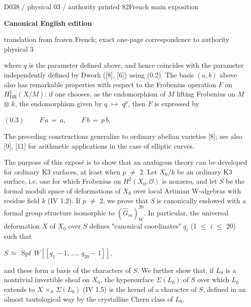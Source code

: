 \documentclass[9pt]{article}
\newcommand{\CanonText}[1]{\par{\fontsize{8.0}{9.35}\selectfont\RaggedRight #1\par}\vspace{2.2pt}}
\newcommand{\CanonDisplay}[1]{\par\vspace{1.2pt}\begin{center}{\fontsize{7.2}{8.4}\selectfont\(\displaystyle #1\)}\end{center}\vspace{1.2pt}}
\newcommand{\LayerTitle}{Canonical English edition}
\begin{document}
\noindent\begin{minipage}[t][\dimexpr\textheight-5pt\relax][t]{\textwidth}
{\sffamily\fontsize{7.3}{8.2}\selectfont\color{Quiet} D038 / physical 03 / authority printed 82\hfill French main exposition}
\par{}\vspace{4.5pt}
{\sffamily\fontsize{10.4}{11.6}\selectfont\bfseries\color{Accent} \LayerTitle}
\par{\sffamily\fontsize{6.7}{7.7}\selectfont\color{Quiet} translation from frozen French; exact one-page correspondence to authority physical 3}
\vspace{5pt}
\CanonText{where \(q\) is the parameter defined above, and hence coincides with the parameter independently defined by Dwork ([8], [6]) using (0.2). The basis \((a,b)\) above also has remarkable properties with respect to the Frobenius operation \(F\) on \(H^{1}_{\mathrm{DR}}(X/M)\): if one chooses, as the endomorphism of \(M\) lifting Frobenius on \(M\) \(\otimes{}\) \(k\), the endomorphism given by \(q\) \(\mapsto{}\) \(q^{p}\), then \(F\) is expressed by}
\CanonDisplay{(0.3)\qquad\,F\,a\,=\,a,\qquad\,F\,b\,=\,p\,b.}
\CanonText{The preceding constructions generalize to ordinary abelian varieties [8]; see also [9], [11] for arithmetic applications in the case of elliptic curves.}
\CanonText{The purpose of this exposé is to show that an analogous theory can be developed for ordinary K3 surfaces, at least when \(p\) \(\neq{}\) 2. Let \(X_{0}/k\) be an ordinary K3 surface, i.e. one for which Frobenius on \(H^{2}(X_{0},\mathcal{O})\) is nonzero, and let \(S\) be the formal moduli space of deformations of \(X_{0}\) over local Artinian W-algebras with residue field \(k\) (IV 1.2). If \(p\) \(\neq{}\) 2, we prove that \(S\) is canonically endowed with a formal group structure isomorphic to \((\widehat{G}_{m})_{W}^{20}\). In particular, the universal deformation \(X\) of \(X_{0}\) over \(S\) defines "canonical coordinates" \(q_{i}\) (1 \(\leq{}\) \(i\) \(\leq{}\) 20) such that}
\CanonDisplay{S\,\simeq{}\,\operatorname{Spf}\,W[[q_{1}-1,\,\ldots{},\,q_{20}-1]],}
\CanonText{and these form a basis of the characters of \(S\). We further show that, if \(L_{0}\) is a nontrivial invertible sheaf on \(X_{0}\), the hypersurface \(\Sigma{}(L_{0})\) of \(S\) over which \(L_{0}\) extends to \(X\) \(\times{}_{S}\) \(\Sigma{}(L_{0})\) (IV 1.5) is the kernel of a character of \(S\), defined in an almost tautological way by the crystalline Chern class of \(L_{0}\).}

\end{minipage}
\end{document}
